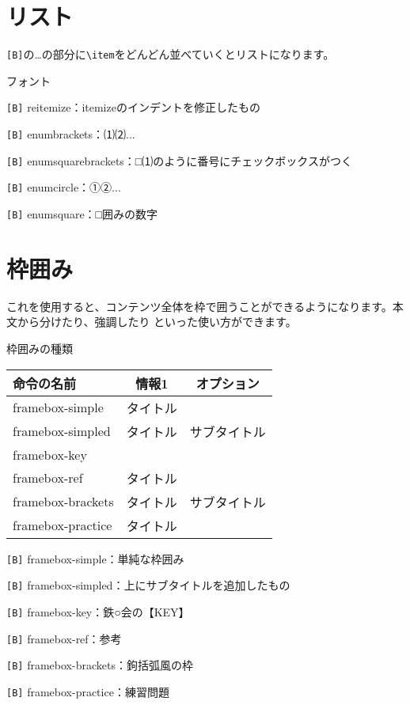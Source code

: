 \begin{multicols*}{2}
\section{リスト}
\verb|[B]|の\dots の部分に\verb|\item|をどんどん並べていくとリストになります。
\begin{framebox-simple}{フォント}
    \begin{reitemize}
        \item \verb|[B]| reitemize：itemizeのインデントを修正したもの
        \item \verb|[B]| enumbrackets：⑴⑵...
        \item \verb|[B]| enumsquarebrackets：□⑴のように番号にチェックボックスがつく
        \item \verb|[B]| enumcircle：①②...
        \item \verb|[B]| enumsquare：□囲みの数字
    \end{reitemize}
\end{framebox-simple}

\section{枠囲み}
これを使用すると、コンテンツ全体を枠で囲うことができるようになります。本文から分けたり、強調したり
といった使い方ができます。
\begin{framebox-simple}{枠囲みの種類}
    \begin{table}[H]
        \begin{tabularx}{64mm}{|X|c|c|}
        \hline
        命令の名前             & 情報1  & オプション  \\ \hline
        framebox-simple   & タイトル &        \\ \hline
        framebox-simpled  & タイトル & サブタイトル \\ \hline
        framebox-key      &      &        \\ \hline
        framebox-ref      & タイトル &        \\ \hline
        framebox-brackets & タイトル & サブタイトル \\ \hline
        framebox-practice & タイトル &        \\ \hline
        \end{tabularx}
    \end{table}
    \begin{reitemize}
        \item \verb|[B]| framebox-simple：単純な枠囲み
        \item \verb|[B]| framebox-simpled：上にサブタイトルを追加したもの
        \item \verb|[B]| framebox-key：鉄○会の【KEY】
        \item \verb|[B]| framebox-ref：参考
        \item \verb|[B]| framebox-brackets：鉤括弧風の枠
        \item \verb|[B]| framebox-practice：練習問題
    \end{reitemize}
\end{framebox-simple}


\end{multicols*}
